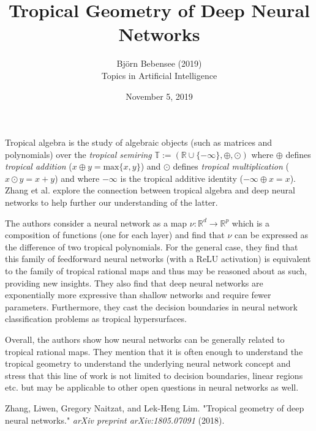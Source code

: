\documentclass[12pt]{article}
\begin{document}
 
 
\title{Tropical Geometry of Deep Neural Networks}
\author{Bj\"orn Bebensee (2019)\\ %
Topics in Artificial Intelligence}
\date{November 5, 2019}
\maketitle

\noindent
Tropical algebra is the study of algebraic objects (such as matrices and polynomials) over the \emph{tropical semiring} $\mathbb{T} := (\mathbb{R} \cup \{-\infty\}, \oplus, \odot)$ where $\oplus$ defines \emph{tropical addition} ($x \oplus y = \text{max}\{x,y \}$) and $\odot$ defines \emph{tropical multiplication} ($x \odot y = x + y$) and where $-\infty$ is the tropical additive identity ($-\infty \oplus x = x$). Zhang et al. \cite{zhang} explore the connection between tropical algebra and deep neural networks to help further our understanding of the latter.

The authors consider a neural network as a map $\nu: \mathbb{R}^d \rightarrow \mathbb{R}^p$ which is a composition of functions (one for each layer) and find that $\nu$ can be expressed as the difference of two tropical polynomials. For the general case, they find that this family of feedforward neural networks (with a ReLU activation) is equivalent to the family of tropical rational maps and thus may be reasoned about as such, providing new insights. They also find that deep neural networks are exponentially more expressive than shallow networks and require fewer parameters. Furthermore, they cast the decision boundaries in neural network classification problems as tropical hypersurfaces.

Overall, the authors show how neural networks can be generally related to tropical rational maps. They mention that it is often enough to understand the tropical geometry to understand the underlying neural network concept and stress that this line of work is not limited to decision boundaries, linear regions etc. but may be applicable to other open questions in neural networks as well.

\begin{thebibliography}{9}
Zhang, Liwen, Gregory Naitzat, and Lek-Heng Lim. "Tropical geometry of deep neural networks." \emph{arXiv preprint arXiv:1805.07091} (2018).

\end{thebibliography}
\end{document}
